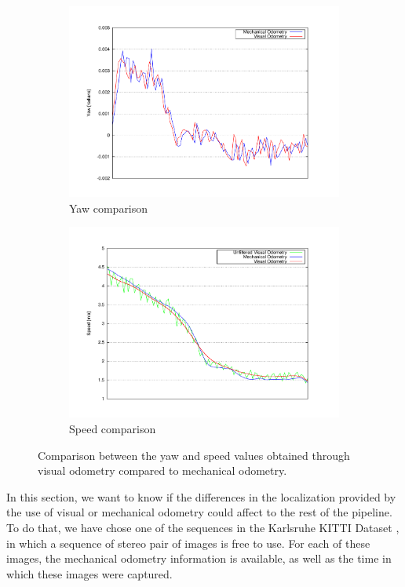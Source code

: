 \begin{figure}[h!]
        \centering
        \begin{subfigure}[b]{\textwidth}
                \centering
                \includegraphics[width=\textwidth,height=0.5\textwidth,trim=50 50 90 60, clip]{yaw}
                \caption{Yaw comparison}\label{fig:cp05_ego_yaw}
        \end{subfigure}
        
        \begin{subfigure}[b]{\textwidth}
                \centering
                \includegraphics[width=\textwidth,height=0.5\textwidth,trim=50 50 90 60, clip]{speed}
                \caption{Speed comparison}\label{fig:cp05_ego_speed}
        \end{subfigure}%
        \caption{Comparison between the yaw and speed values obtained through visual odometry compared to mechanical odometry.}\label{fig:cp05_comparison_ego_yaw_speed}
\end{figure}

In this section, we want to know if the differences in the localization provided by the use of visual or mechanical odometry could affect to the rest of the pipeline. To do that, we have chose one of the sequences in the Karlsruhe KITTI Dataset \citep{geiger2013vision}, in which a sequence of stereo pair of images is free to use. For each of these images, the mechanical odometry information is available, as well as the time in which these images were captured.


